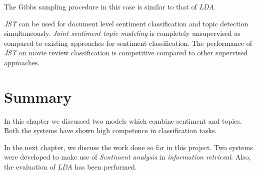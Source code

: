 The Gibbs sampling procedure in this case is similar to that of \textit{LDA}. 

\par
\textit{JST} can be used for document level sentiment classification and topic detection simultaneously. \textit{Joint sentiment topic modeling}
is completely unsupervised as compared to existing approaches for sentiment classification. The performance of \textit{JST} on movie review
classification is competitive compared to other supervised approaches.

\section*{Summary}
In this chapter we discussed two models which combine sentiment and topics. Both the systems have shown high competence in classification tasks.

In the next chapter, we discuss the work done so far in this project. Two systems were developed to make use of \textit{Sentiment analysis}
in \textit{information retrieval}. Also, the evaluation of \textit{LDA} has been performed.

\clearpage